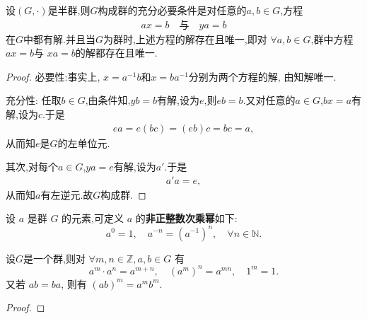 \documentclass[../../main.tex]{subfiles}%
\begin{document}
\begin{theorem}\label{theorem:群的充要条件--方程有解}
设$(G,\cdot)$是半群,则$G$构成群的充分必要条件是对任意的$a,b \in G$,方程
\begin{align*}
ax = b \quad \text{与} \quad ya = b
\end{align*}
在$G$中都有解.并且当$G$为群时,上述方程的解存在且唯一,即对 \(\forall a, b \in G \),群中方程 \( ax = b \)与 \( xa = b \)的解都存在且唯一.
\end{theorem}
\begin{proof}

{\heiti 必要性:}事实上, \( x = a^{-1}b \)和\( x = ba^{-1} \)分别为两个方程的解, 由知解唯一.

{\heiti 充分性:} 任取$b \in G$,由条件知,$yb = b$有解,设为$e$,则$eb = b$.又对任意的$a \in G$,$bx = a$有解,设为$c$.于是
\begin{align*}
ea = e(bc) = (eb)c = bc = a,
\end{align*}
从而知$e$是$G$的左单位元.

其次,对每个$a \in G$,$ya = e$有解,设为$a'$.于是
\begin{align*}
a'a = e,
\end{align*}
从而知$a$有左逆元.故$G$构成群.
\end{proof}

\begin{definition}
设 \( a \) 是群 \( G \) 的元素,可定义 \( a \) 的\textbf{非正整数次乘幂}如下:
\[
a^0 = 1, \quad a^{-n} = (a^{-1})^n, \quad \forall n \in \mathbb{N}.
\]
\end{definition}

\begin{theorem}
设$G$是一个群,则对 \( \forall m, n \in \mathbb{Z}, a, b \in G \) 有
\[
a^m \cdot a^n = a^{m+n}, \quad (a^m)^n = a^{mn}, \quad 1^m = 1.
\]
又若 \( ab = ba \), 则有 \( (ab)^m = a^m b^m \).
\end{theorem}
\begin{proof}

\end{proof}
\end{document}
